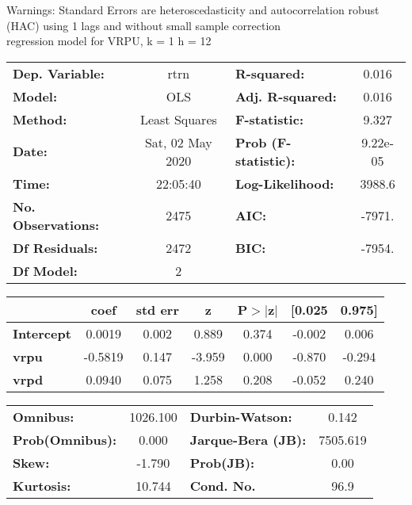 Warnings: \newline
 [1] Standard Errors are heteroscedasticity and autocorrelation robust (HAC) using 1 lags and without small sample correction\\ 

regression model for VRPU, k = 1 h = 12\begin{center}
\begin{tabular}{lclc}
\toprule
\textbf{Dep. Variable:}    &       rtrn       & \textbf{  R-squared:         } &     0.016   \\
\textbf{Model:}            &       OLS        & \textbf{  Adj. R-squared:    } &     0.016   \\
\textbf{Method:}           &  Least Squares   & \textbf{  F-statistic:       } &     9.327   \\
\textbf{Date:}             & Sat, 02 May 2020 & \textbf{  Prob (F-statistic):} &  9.22e-05   \\
\textbf{Time:}             &     22:05:40     & \textbf{  Log-Likelihood:    } &    3988.6   \\
\textbf{No. Observations:} &        2475      & \textbf{  AIC:               } &    -7971.   \\
\textbf{Df Residuals:}     &        2472      & \textbf{  BIC:               } &    -7954.   \\
\textbf{Df Model:}         &           2      & \textbf{                     } &             \\
\bottomrule
\end{tabular}
\begin{tabular}{lcccccc}
                   & \textbf{coef} & \textbf{std err} & \textbf{z} & \textbf{P$> |$z$|$} & \textbf{[0.025} & \textbf{0.975]}  \\
\midrule
\textbf{Intercept} &       0.0019  &        0.002     &     0.889  &         0.374        &       -0.002    &        0.006     \\
\textbf{vrpu}      &      -0.5819  &        0.147     &    -3.959  &         0.000        &       -0.870    &       -0.294     \\
\textbf{vrpd}      &       0.0940  &        0.075     &     1.258  &         0.208        &       -0.052    &        0.240     \\
\bottomrule
\end{tabular}
\begin{tabular}{lclc}
\textbf{Omnibus:}       & 1026.100 & \textbf{  Durbin-Watson:     } &    0.142  \\
\textbf{Prob(Omnibus):} &   0.000  & \textbf{  Jarque-Bera (JB):  } & 7505.619  \\
\textbf{Skew:}          &  -1.790  & \textbf{  Prob(JB):          } &     0.00  \\
\textbf{Kurtosis:}      &  10.744  & \textbf{  Cond. No.          } &     96.9  \\
\bottomrule
\end{tabular}
\end{center}

